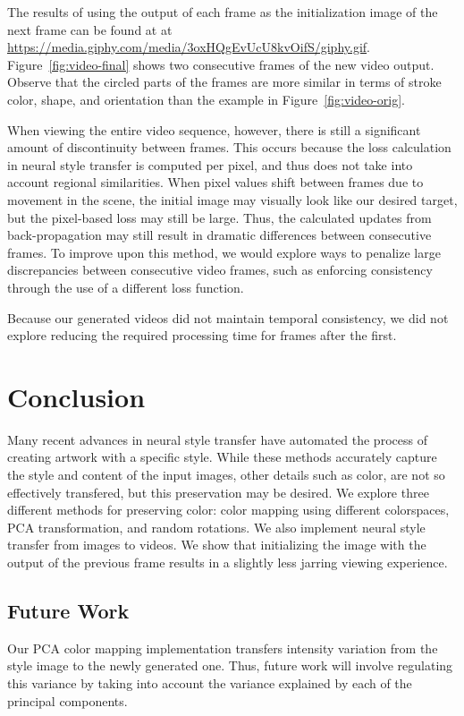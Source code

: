 \documentclass[10pt,twocolumn,letterpaper]{article}
\begin{document}
The results of using the output of each frame as the initialization image of the next frame can be found at at \url{https://media.giphy.com/media/3oxHQgEvUcU8kvOifS/giphy.gif}. Figure~\ref{fig:video-final} shows two consecutive frames of the new video output. Observe that the circled parts of the frames are more similar in terms of stroke color, shape, and orientation than the example in Figure~\ref{fig:video-orig}.

When viewing the entire video sequence, however, there is still a significant amount of discontinuity between frames. This occurs because the loss calculation in neural style transfer is computed per pixel, and thus does not take into account regional similarities. When pixel values shift between frames due to movement in the scene, the initial image may visually look like our desired target, but the pixel-based loss may still be large. Thus, the calculated updates from back-propagation may still result in dramatic differences between consecutive frames. To improve upon this method, we would explore ways to penalize large discrepancies between consecutive video frames, such as enforcing consistency through the use of a different loss function.

Because our generated videos did not maintain temporal consistency, we did not explore reducing the required processing time for frames after the first.

\section{Conclusion}
Many recent advances in neural style transfer have automated the process of creating artwork with a specific style. While these methods accurately capture the style and content of the input images, other details such as color, are not so effectively transfered, but this preservation may be desired. We explore three different methods for preserving color: color mapping using different colorspaces, PCA transformation, and random rotations. We also implement neural style transfer from images to videos. We show that initializing the image with the output of the previous frame results in a slightly less jarring viewing experience.

\subsection{Future Work}
Our PCA color mapping implementation transfers intensity variation from the style image to the newly generated one. Thus, future work will involve regulating this variance by taking into account the variance explained by each of the principal components.
\end{document}
